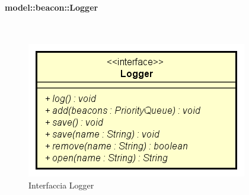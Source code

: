 \documentclass[../DefinizioneDiProdotto.tex]{subfiles}
\begin{document}
\paragraph{model::beacon::Logger}
\
\begin{figure}[H]
	\centering
	\includegraphics[width=\maxwidth]{img/Logger.png}
	\caption{Interfaccia Logger}\label{fig:model::beacon::Logger} 
\end{figure}
\end{document}
